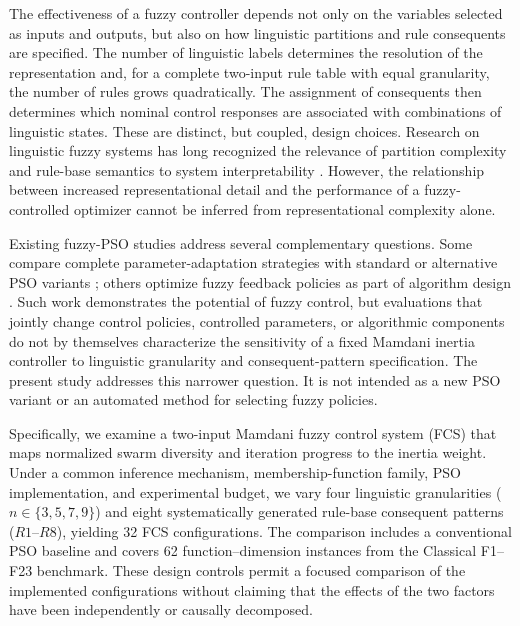 The effectiveness of a fuzzy controller depends not only on the variables selected as inputs and outputs, but also on how linguistic partitions and rule consequents are specified. The number of linguistic labels determines the resolution of the representation and, for a complete two-input rule table with equal granularity, the number of rules grows quadratically. The assignment of consequents then determines which nominal control responses are associated with combinations of linguistic states. These are distinct, but coupled, design choices. Research on linguistic fuzzy systems has long recognized the relevance of partition complexity and rule-base semantics to system interpretability \cite{Gacto2011,Castiello2019}. However, the relationship between increased representational detail and the performance of a fuzzy-controlled optimizer cannot be inferred from representational complexity alone.

Existing fuzzy-PSO studies address several complementary questions. Some compare complete parameter-adaptation strategies with standard or alternative PSO variants \cite{Valdez2017,Xia2023}; others optimize fuzzy feedback policies as part of algorithm design \cite{Roy2024}. Such work demonstrates the potential of fuzzy control, but evaluations that jointly change control policies, controlled parameters, or algorithmic components do not by themselves characterize the sensitivity of a fixed Mamdani inertia controller to linguistic granularity and consequent-pattern specification. The present study addresses this narrower question. It is not intended as a new PSO variant or an automated method for selecting fuzzy policies.

Specifically, we examine a two-input Mamdani fuzzy control system (FCS) that maps normalized swarm diversity and iteration progress to the inertia weight. Under a common inference mechanism, membership-function family, PSO implementation, and experimental budget, we vary four linguistic granularities ($n\in\{3,5,7,9\}$) and eight systematically generated rule-base consequent patterns ($R1$--$R8$), yielding 32 FCS configurations. The comparison includes a conventional PSO baseline and covers 62 function--dimension instances from the Classical F1--F23 benchmark. These design controls permit a focused comparison of the implemented configurations without claiming that the effects of the two factors have been independently or causally decomposed.

